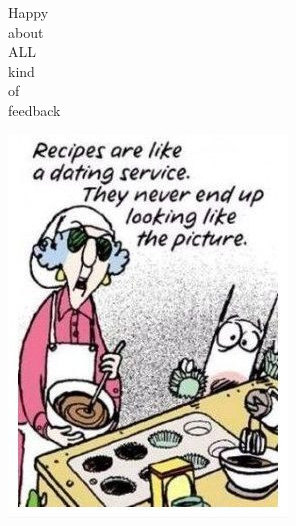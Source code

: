 \documentclass[12pt]{beamer}
\begin{document}
	
\begin{frame}
	\begin{minipage}{0.2\textwidth}
		\begin{center} \Large
			Happy\\
			about\\
			ALL\\
			kind\\
			of\\
			feedback\\
			
		\end{center}			
	\end{minipage}
	\begin{minipage}{0.65\textwidth}
		\hspace{2cm}\includegraphics[scale=0.7]{Images/Recipes-are-like-a-dating-service}
	\end{minipage}
\end{frame}
\end{document}
